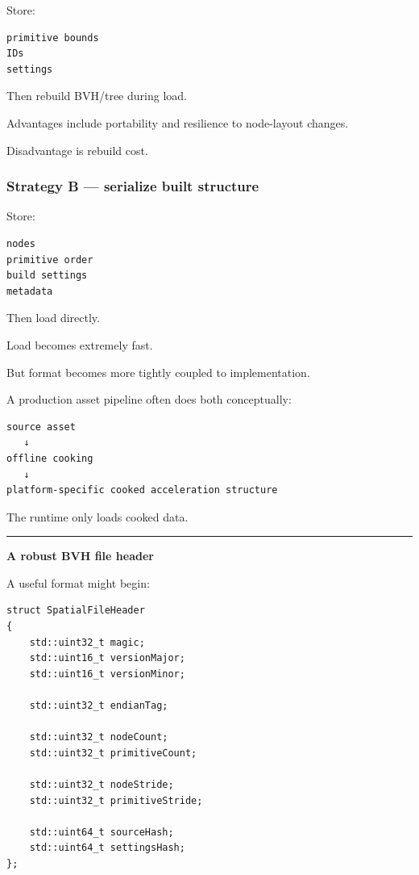 Store:

\begin{verbatim}
primitive bounds
IDs
settings
\end{verbatim}

Then rebuild BVH/tree during load.

Advantages include portability and resilience to node-layout changes.

Disadvantage is rebuild cost.

\subsubsection{Strategy B --- serialize built structure}\label{strategy-b-serialize-built-structure}

Store:

\begin{verbatim}
nodes
primitive order
build settings
metadata
\end{verbatim}

Then load directly.

Load becomes extremely fast.

But format becomes more tightly coupled to implementation.

A production asset pipeline often does both conceptually:

\begin{verbatim}
source asset
   ↓
offline cooking
   ↓
platform-specific cooked acceleration structure
\end{verbatim}

The runtime only loads cooked data.

\begin{center}\rule{0.5\linewidth}{0.5pt}\end{center}

\textbf{A robust BVH file header}

A useful format might begin:

\begin{verbatim}
struct SpatialFileHeader
{
    std::uint32_t magic;
    std::uint16_t versionMajor;
    std::uint16_t versionMinor;

    std::uint32_t endianTag;

    std::uint32_t nodeCount;
    std::uint32_t primitiveCount;

    std::uint32_t nodeStride;
    std::uint32_t primitiveStride;

    std::uint64_t sourceHash;
    std::uint64_t settingsHash;
};
\end{verbatim}

